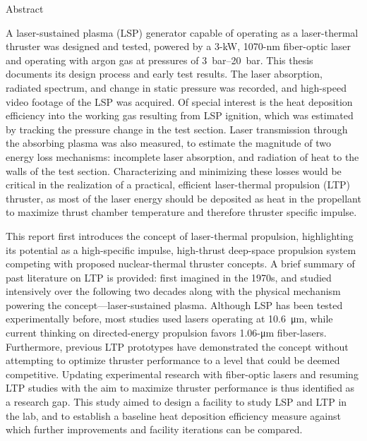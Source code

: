 \begin{plainchp}{Abstract}

    A laser-sustained plasma (LSP) generator capable of operating as a laser-thermal thruster was designed and tested, powered by a \num{3}-\unit{kW}, \num{1070}-\unit{nm} fiber-optic laser and operating with argon gas at pressures of \qtyrange{3}{20}{bar}. This thesis documents its design process and early test results. The laser absorption, radiated spectrum, and change in static pressure was recorded, and high-speed video footage of the LSP was acquired. Of special interest is the heat deposition efficiency into the working gas resulting from LSP ignition, which was estimated by tracking the pressure change in the test section. Laser transmission through the absorbing plasma was also measured, to estimate the magnitude of two energy loss mechanisms: incomplete laser absorption, and radiation of heat to the walls of the test section. Characterizing and minimizing these losses would be critical in the realization of a practical, efficient laser-thermal propulsion (LTP) thruster, as most of the laser energy should be deposited as heat in the propellant to maximize thrust chamber temperature and therefore thruster specific impulse.

    This report first introduces the concept of laser-thermal propulsion, highlighting its potential as a high-specific impulse, high-thrust deep-space pro\-pulsion system competing with proposed nuclear-thermal thruster concepts. A brief summary of past literature on LTP is provided: first imagined in the 1970s, and studied intensively over the following two decades along with the physical mechanism powering the concept---laser-sustained plasma. Although LSP has been tested experimentally before, most studies used  lasers operating at \qty{10.6}{\um}, while current thinking on directed-energy pro\-pulsion favors \num{1.06}-\unit{\um} fiber-lasers. Furthermore, previous LTP prototypes have demonstrated the concept without attempting to optimize thruster performance to a level that could be deemed competitive. Updating experimental research with fiber-optic lasers and resuming LTP studies with the aim to maximize thruster performance is thus identified as a research gap. This study aimed to design a facility to study LSP and LTP in the lab, and to establish a baseline heat deposition efficiency measure against which further improvements and facility iterations can be compared.


\end{plainchp}
